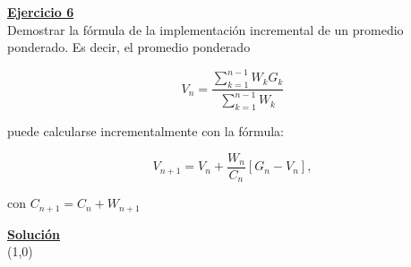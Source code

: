 \indent\underline{\textbf{Ejercicio 6}}\\
Demostrar la fórmula de la implementación incremental de un promedio ponderado.
Es decir, el promedio ponderado

\[
    V_n = \frac{\sum_{k=1}^{n-1} W_k G_k}{\sum_{k=1}^{n-1} W_k}
\]

puede calcularse incrementalmente con la fórmula:

\[
    V_{n+1} = V_n + \frac{W_n}{C_n}\left[G_n - V_n\right],
\]

con $C_{n+1} = C_n + W_{n+1}$

\indent\underline{\textbf{Solución}}\\

\line(1,0){\textwidth}

